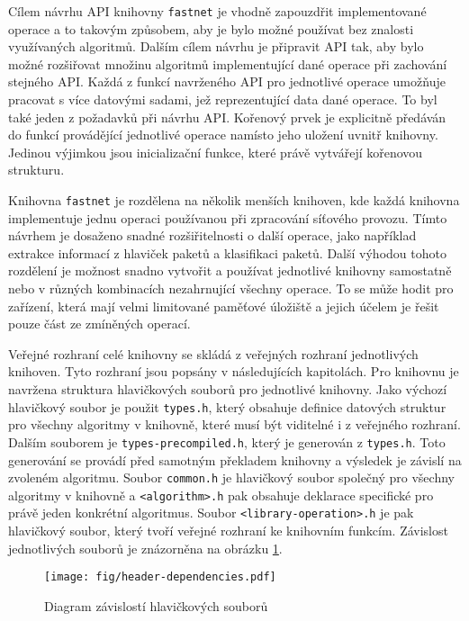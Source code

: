 Cílem návrhu API knihovny \texttt{fastnet} je vhodně zapouzdřit implementované operace a to takovým způsobem,
aby je bylo možné používat bez znalosti využívaných algoritmů. Dalším cílem návrhu je připravit API tak,
aby bylo možné rozšiřovat množinu algoritmů implementující dané operace při zachování
stejného API.
Každá z funkcí navrženého API pro jednotlivé operace umožňuje pracovat s více datovými sadami, jež reprezentující
data dané operace. To byl také jeden z požadavků při návrhu API. Kořenový prvek je
explicitně předáván do funkcí provádějící jednotlivé operace namísto jeho uložení uvnitř knihovny. Jedinou výjimkou
jsou inicializační funkce, které právě vytvářejí kořenovou strukturu.

Knihovna \texttt{fastnet} je rozdělena na několik menších knihoven, kde každá knihovna implementuje
jednu operaci používanou při zpracování síťového provozu.
Tímto návrhem je dosaženo snadné rozšiřitelnosti o další operace,
jako například extrakce informací z hlaviček paketů a klasifikaci paketů.
Další výhodou tohoto rozdělení je možnost snadno vytvořit a používat jednotlivé knihovny samostatně nebo v různých kombinacích nezahrnující všechny operace.
To se může hodit pro zařízení, která mají velmi limitované paměťové úložiště a jejich účelem
je řešit pouze část ze zmíněných operací.

Veřejné rozhraní celé knihovny se skládá z veřejných rozhraní jednotlivých knihoven.
Tyto rozhraní jsou popsány v následujících kapitolách.
Pro knihovnu je navržena struktura hlavičkových souborů pro jednotlivé knihovny.
Jako výchozí hlavičkový soubor je použit \texttt{types.h},
který obsahuje definice datových struktur pro všechny algoritmy v knihovně, které musí být
viditelné i z veřejného rozhraní. Dalším souborem je \texttt{types-precompiled.h},
který je generován z \texttt{types.h}. Toto generování se provádí před samotným překladem knihovny
a výsledek je závislí na zvoleném algoritmu.
Soubor \texttt{common.h} je hlavičkový soubor společný pro všechny algoritmy v knihovně a \texttt{<algorithm>.h}
pak obsahuje deklarace specifické pro právě jeden konkrétní algoritmus.
Soubor \texttt{<library-operation>.h} je pak hlavičkový soubor, který tvoří veřejné rozhraní ke knihovním funkcím.
Závislost jednotlivých souborů je znázorněna na obrázku \ref{fig:header-dependecies}.

\begin{figure}[!htbp]
    \centering
    \texttt{[image: fig/header-dependencies.pdf]}
    \caption{Diagram závislostí hlavičkových souborů}
    \label{fig:header-dependecies}
\end{figure}

